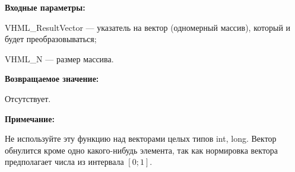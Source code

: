 \textbf{Входные параметры:}

 VHML\_ResultVector --- указатель на вектор (одномерный массив), который и будет преобразовываться;
 
 VHML\_N --- размер массива.

\textbf{Возвращаемое значение:} 
 
Отсутствует.

\textbf{Примечание:} 

Не используйте эту функцию над векторами целых типов int, long. Вектор обнулится кроме одно какого-нибудь элемента, так как нормировка вектора предполагает числа из интервала $[0;1]$.